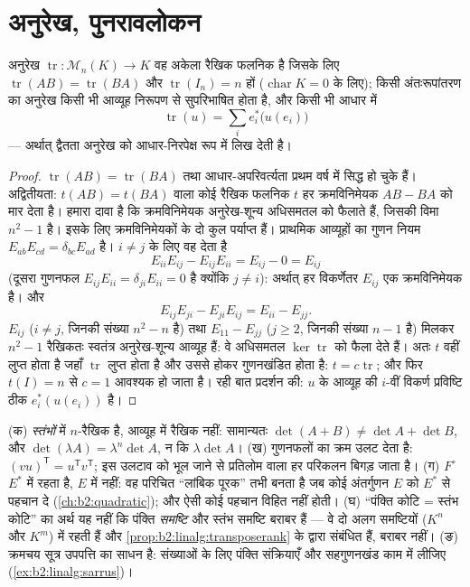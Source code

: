 \section{अनुरेख, पुनरावलोकन}

\begin{proposition}\label{prop:b2:linalg:trace}
अनुरेख $\operatorname{tr} \colon \mathcal{M}_n(K) \to K$ वह अकेला रैखिक फलनिक है जिसके लिए $\operatorname{tr}(AB) =
\operatorname{tr}(BA)$ और $\operatorname{tr}(I_n) = n$ हों ($\operatorname{char} K = 0$ के
लिए); किसी अंतःरूपांतरण का अनुरेख किसी भी आव्यूह निरूपण से सुपरिभाषित
होता है, और किसी भी आधार में
\[
\operatorname{tr}(u) = \sum_{i} e_i^*\bigl(u(e_i)\bigr)
\]
--- अर्थात् द्वैतता अनुरेख को आधार-निरपेक्ष रूप में लिख देती है।
\end{proposition}

\begin{proof}
$\operatorname{tr}(AB) = \operatorname{tr}(BA)$ तथा आधार-अपरिवर्त्यता प्रथम वर्ष में सिद्ध हो चुके हैं।
अद्वितीयता: $t(AB) =
t(BA)$ वाला कोई रैखिक फलनिक $t$ हर क्रमविनिमेयक $AB - BA$ को मार
देता है। हमारा दावा है कि क्रमविनिमेयक अनुरेख-शून्य अधिसमतल को फैलाते
हैं, जिसकी विमा $n^2 - 1$ है। इसके लिए क्रमविनिमेयकों के दो कुल पर्याप्त
हैं। प्राथमिक आव्यूहों का गुणन नियम $E_{ab}E_{cd} = \delta_{bc}E_{ad}$ है। $i \neq j$ के लिए वह देता है
\[
E_{ii}E_{ij} - E_{ij}E_{ii} = E_{ij} - 0 = E_{ij}
\]
(दूसरा गुणनफल $E_{ij}E_{ii} = \delta_{ji}E_{ii} = 0$ है क्योंकि $j \neq i$): अर्थात् हर विकर्णेतर $E_{ij}$ एक
क्रमविनिमेयक है। और
\[
E_{ij}E_{ji} - E_{ji}E_{ij} = E_{ii} - E_{jj} .
\]
$E_{ij}$ ($i \neq j$, जिनकी संख्या $n^2 - n$ है) तथा $E_{11} - E_{jj}$ ($j \geq 2$, जिनकी संख्या $n - 1$
है) मिलकर $n^2 - 1$ रैखिकतः स्वतंत्र अनुरेख-शून्य आव्यूह हैं: वे अधिसमतल
$\ker\operatorname{tr}$ को फैला देते हैं। अतः $t$ वहीं लुप्त होता है जहाँ $\operatorname{tr}$ लुप्त
होता है और उससे होकर गुणनखंडित होता है: $t =
c\operatorname{tr}$; और फिर $t(I) = n$ से $c = 1$
आवश्यक हो जाता है। रही बात प्रदर्शन की: $u$ के आव्यूह की $i$-वीं
विकर्ण प्रविष्टि ठीक $e_i^*(u(e_i))$ है।
\end{proof}

\begin{remark}[सामान्य भूलें]\label{rem:b2:linalg:pitfalls}
(क)  \emph{स्तंभों} में $n$-रैखिक है, आव्यूह में रैखिक नहीं:
सामान्यतः $\det(A + B) \neq \det A + \det B$, और $\det(\lambda A) = \lambda^n\det A$, न कि $\lambda\det A$। (ख)  गुणनफलों का क्रम उलट
देता है: $(vu)^{\mathsf T} = u^{\mathsf T}v^{\mathsf T}$; इस उलटाव को भूल जाने से प्रतिलोम वाला हर परिकलन बिगड़
जाता है। (ग)  $F^\circ$ $E^*$ में रहता है, $E$ में नहीं: वह परिचित
``लांबिक पूरक'' तभी बनता है जब कोई अंतर्गुणन $E$ को $E^*$ से पहचान दे
(\cref{ch:b2:quadratic}); और ऐसी कोई पहचान विहित नहीं होती। (घ) ``पंक्ति कोटि = स्तंभ
कोटि'' का अर्थ यह नहीं कि पंक्ति \emph{समष्टि} और स्तंभ समष्टि बराबर
हैं --- वे दो अलग समष्टियों ($K^n$ और $K^m$) में रहती हैं और \cref{prop:b2:linalg:transposerank} के
द्वारा संबंधित हैं, बराबर नहीं। (ङ) क्रमचय सूत्र उपपत्ति का साधन है:
संख्याओं के लिए पंक्ति संक्रियाएँ और सहगुणनखंड काम में लीजिए (\cref{ex:b2:linalg:sarrus})।
\end{remark}

